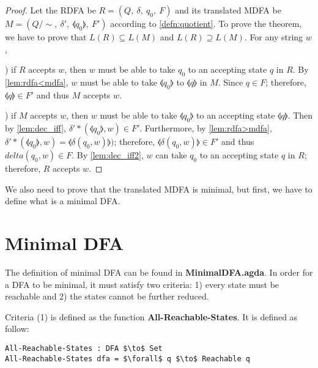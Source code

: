 \begin{proof}
\noindent Let the RDFA be \(R = (Q,\ \delta,\ q_0,\ F)\) and its
translated MDFA be \(M = (Q/\!\sim,\ \delta',\ \llangle q_0 \rrangle,\
F')\) according to \autoref{defn:quotient}. To prove the theorem, we
have to prove that \(L(R) \subseteq L(M)\) and \(L(R) \supseteq
L(M)\). For any string \(w\),

\par {}) if \(R\) accepts \(w\), then \(w\) must be able to
take \(q_0\) to an accepting state \(q\) in \(R\). By \autoref{lem:rdfa<mdfa},
\(w\) must be able to take \(\llangle q_0 \rrangle\) to \(\llangle q
\rrangle\) in \(M\). Since \(q \in F\); therefore, \(\llangle q
\rrangle \in F'\) and thus \(M\) accepts \(w\). 

\par {}) if \(M\) accepts \(w\), then \(w\) must be able to
take \(\llangle q_0 \rrangle\) to an accepting state \(\llangle q
\rrangle\). Then by \autoref{lem:dec_iff}, \(\delta'*(\llangle q_0
\rrangle,w) \in F'\). Furthermore, by \autoref{lem:rdfa>mdfa},
\(\delta'*(\llangle q_0 \rrangle,w) = \llangle \delta(q_0,w)
\rrangle)\); therefore, \(\llangle \delta(q_0,w) \rrangle \in F'\) and
thus \(delta(q_0,w) \in F\). By \autoref{lem:dec_iff2}, \(w\) can take
\(q_0\) to an accepting state \(q\) in \(R\); therefore, \(R\) accepts
\(w\). 
\end{proof}

\par We also need to prove that the translated MDFA is minimal, but
first, we have to define what is a minimal DFA. 


\section{Minimal DFA}
\par The definition of minimal DFA can be found in
\textbf{MinimalDFA.agda}. In order for a DFA to be minimal,
it must satisfy two criteria: 1) every state must be reachable and 2) the
states cannot be further reduced. 

\par Criteria (1) is defined as the function
\textbf{All-Reachable-States}. It is defined as follow: 
\begin{lstlisting}[mathescape=true,xleftmargin=.1\textwidth]
All-Reachable-States : DFA $\to$ Set
All-Reachable-States dfa = $\forall$ q $\to$ Reachable q
\end{lstlisting}

